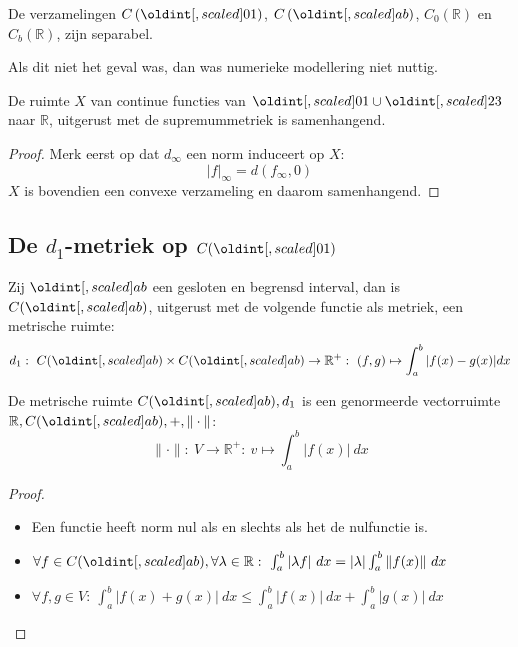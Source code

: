 \documentclass[main.tex]{subfiles}
\begin{document}
\begin{vb}
  De verzamelingen $C\left(\interval{0}{1}\right)$, $C\left(\interval{a}{b}\right)$, $C_{0}\left(\mathbb{R}\right)$ en $C_{b}\left(\mathbb{R}\right)$, zijn separabel.
\end{vb}

\begin{opm}
  Als dit niet het geval was, dan was numerieke modellering niet nuttig.
\end{opm}

\begin{vb}
  De ruimte $X$ van continue functies van $\interval{0}{1} \cup \interval{2}{3}$ naar $\mathbb{R}$, uitgerust met de supremummetriek is samenhangend.

  \begin{proof}
    Merk eerst op dat $d_{\infty}$ een norm induceert op $X$:
    \[ |f|_{\infty} = d(f_{\infty},0) \]
    $X$ is bovendien een convexe verzameling en daarom samenhangend.
  \end{proof}
\end{vb}


\subsection{De $d_1$-metriek op $C(\interval{0}{1})$}
\label{sec:de-d_1-metriek}

\begin{vb}
  Zij $\interval{a}{b}$ een gesloten en begrensd interval, dan is $C(\interval{a}{b})$, uitgerust met de volgende functie als metriek, een metrische ruimte:
  \[ d_{1}:\ C(\interval{a}{b})\times C(\interval{a}{b}) \rightarrow \mathbb{R}^{+}:\ (f,g) \mapsto \int_{a}^{b}|f(x)-g(x)|dx \]
\end{vb}


\begin{vb}
  De metrische ruimte $C(\interval{a}{b}),d_{1}$ is een genormeerde vectorruimte $\mathbb{R},C(\interval{a}{b}),+,\Vert\cdot\Vert$:
  \[ \|\cdot\|:\ V \rightarrow \mathbb{R}^{+}:\ v \mapsto \int_{a}^{b}\left|f(x)\right|\ dx \]

  \begin{proof}
    \noindent

    \begin{itemize}
    \item Een functie heeft norm nul als en slechts als het de nulfunctie is.
    \item $\forall f\in C(\interval{a}{b}), \forall \lambda \in \mathbb{R}:\ \int_{a}^{b}|\lambda f|\ dx = |\lambda|\int_{a}^{b}\|f(x)\|\ dx$
    \item $\forall f,g\in V:\ \int_{a}^{b}|f(x)+g(x)|\ dx \le \int_{a}^{b}|f(x)|\ dx + \int_{a}^{b}|g(x)|\ dx$
    \end{itemize}
  \end{proof}
\end{vb}
\end{document}
